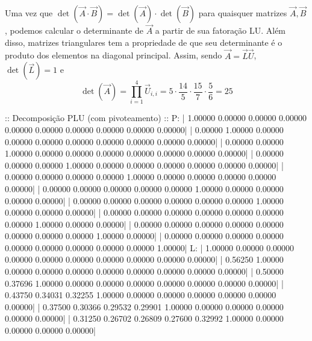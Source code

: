 \documentclass{homework}
\begin{document}
	Uma vez que $\det\left(\vec{A} \cdot \vec{B}\right) = \det \left(\vec{A}\right) \cdot \det \left(\vec{B}\right)$ para quaisquer matrizes $\vec{A}, \vec{B}$, podemos calcular o determinante de $\vec{A}$ a partir de sua fatoração LU. Além disso, matrizes triangulares tem a propriedade de que seu determinante é o produto dos elementos na diagonal principal. Assim, sendo $\vec{A} = \vec{L}\vec{U}$, $\det \left(\vec{L}\right) = 1$ e 
		$$ \det\left(\vec{A}\right) = \prod_{i = 1}^{4} \vec{U}_{i, i} = 5 \cdot \frac{14}{5} \cdot  \frac{15}{7} \cdot \frac{5}{6} = 25 $$
		
	
	\begin{fortran}
	 :: Decomposição PLU (com pivoteamento) ::
	P:
	|   1.00000    0.00000    0.00000    0.00000    0.00000    0.00000    0.00000    0.00000    0.00000    0.00000|
	|   0.00000    1.00000    0.00000    0.00000    0.00000    0.00000    0.00000    0.00000    0.00000    0.00000|
	|   0.00000    0.00000    1.00000    0.00000    0.00000    0.00000    0.00000    0.00000    0.00000    0.00000|
	|   0.00000    0.00000    0.00000    1.00000    0.00000    0.00000    0.00000    0.00000    0.00000    0.00000|
	|   0.00000    0.00000    0.00000    0.00000    1.00000    0.00000    0.00000    0.00000    0.00000    0.00000|
	|   0.00000    0.00000    0.00000    0.00000    0.00000    1.00000    0.00000    0.00000    0.00000    0.00000|
	|   0.00000    0.00000    0.00000    0.00000    0.00000    0.00000    1.00000    0.00000    0.00000    0.00000|
	|   0.00000    0.00000    0.00000    0.00000    0.00000    0.00000    0.00000    1.00000    0.00000    0.00000|
	|   0.00000    0.00000    0.00000    0.00000    0.00000    0.00000    0.00000    0.00000    1.00000    0.00000|
	|   0.00000    0.00000    0.00000    0.00000    0.00000    0.00000    0.00000    0.00000    0.00000    1.00000|
	L:
	|   1.00000    0.00000    0.00000    0.00000    0.00000    0.00000    0.00000    0.00000    0.00000    0.00000|
	|   0.56250    1.00000    0.00000    0.00000    0.00000    0.00000    0.00000    0.00000    0.00000    0.00000|
	|   0.50000    0.37696    1.00000    0.00000    0.00000    0.00000    0.00000    0.00000    0.00000    0.00000|
	|   0.43750    0.34031    0.32255    1.00000    0.00000    0.00000    0.00000    0.00000    0.00000    0.00000|
	|   0.37500    0.30366    0.29532    0.29901    1.00000    0.00000    0.00000    0.00000    0.00000    0.00000|
	|   0.31250    0.26702    0.26809    0.27600    0.32992    1.00000    0.00000    0.00000    0.00000    0.00000|

\end{fortran}
\end{document}

